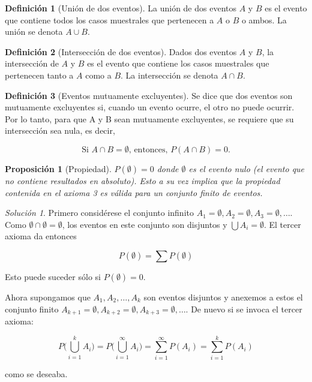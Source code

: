 \documentclass[
  11pt,
]{book}
\newtheorem{proposition}{Proposición}[chapter]
\theoremstyle{definition}
\newtheorem{definition}{Definición}[chapter]
\theoremstyle{definition}
\theoremstyle{definition}
\theoremstyle{definition}
\theoremstyle{remark}
\newtheorem*{solution}{Solución }
\begin{document}
\begin{definition}[Unión de dos eventos]
La unión de dos eventos \(A\) y \(B\) es el evento que contiene todos los casos muestrales que pertenecen a \(A\) o \(B\) o ambos. La unión se denota \(A \cup B\).
\end{definition}

\begin{definition}[Intersección de dos eventos]
Dados dos eventos \(A\) y \(B\), la intersección de \(A\) y \(B\) es el evento que contiene los casos muestrales que pertenecen tanto a \(A\) como a \(B\). La intersección se denota \(A \cap B\).
\end{definition}

\begin{definition}[Eventos mutuamente excluyentes]

Se dice que dos eventos son mutuamente excluyentes si, cuando un evento ocurre, el otro no puede ocurrir. Por lo tanto, para que A y B sean mutuamente excluyentes, se requiere que su intersección sea nula, es decir,

\begin{equation}
\text{Si } A \cap B = \emptyset \text{, entonces, } P(A \cap B) = 0.
\label{eq:excluyentes}
\end{equation}

\end{definition}

\begin{proposition}[Propiedad]
\(P(\emptyset) = 0\) donde \(\emptyset\) es el evento nulo (el evento que no contiene resultados en absoluto). Esto a su vez implica que la propiedad contenida en el axioma 3 es válida para un conjunto \textit{finito} de eventos.
\end{proposition}

\begin{solution}
Primero considérese el conjunto infinito \(A_{1} = \emptyset, A_{2} = \emptyset, A_{3} = \emptyset, \dots\). Como \(\emptyset \cap \emptyset = \emptyset\), los eventos en este conjunto son disjuntos y \(\bigcup A_{i} = \emptyset\). El tercer axioma da entonces

\[
P(\emptyset) = \sum P(\emptyset)
\]

Esto puede suceder sólo si \(P(\emptyset) = 0\).

Ahora supongamos que \(A_{1}, A_{2}, \dots, A_{k}\) son eventos disjuntos y anexemos a estos el conjunto finito \(A_{k+1} = \emptyset, A_{k+2} = \emptyset, A_{k+3} = \emptyset, \dots\). De nuevo si se invoca el tercer axioma:

\[
P\bigg(\bigcup_{i=1}^{k} A_{i}\bigg) = P\bigg(\bigcup_{i=1}^{\infty} A_{i}\bigg) = \sum_{i=1}^{\infty} P(A_{i}) = \sum_{i=1}^{k} P(A_{i})
\]

como se deseaba.
\end{solution}
\end{document}
